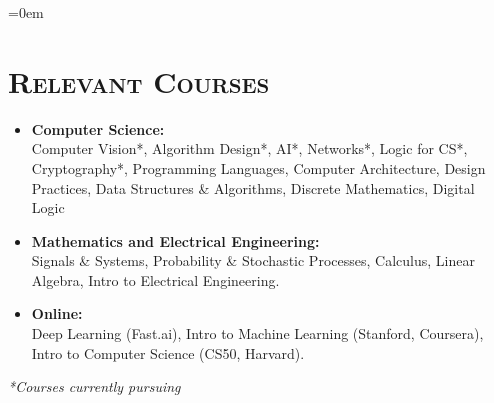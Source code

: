 \documentclass{article}
\makeatletter
\newenvironment{longversion}{}{} %
\newcommand{\headerrow}[2]
{\begin{tabular*}{\linewidth}{l@{\extracolsep{\fill}}r}
	#1 &
	#2 \\
\end{tabular*}}
\newcommand{\tmpsection}[1]{}
\let\tmpsection=\section
\renewcommand{\section}[1]{\tmpsection*{\textsc{#1}}}
\makeatother
\begin{document}
\begin{longversion}
\begin{list} {}{\leftmargin=0em}

\end{list}


\end{longversion}

\begin{longversion}
\section{Relevant Courses}
\begin{itemize}
\setlength\itemsep{-1em}
\item \textbf{Computer Science:} \\ 
Computer Vision*, Algorithm Design*, AI*, Networks*, Logic for CS*, Cryptography*, Programming Languages, Computer Architecture, Design Practices, Data Structures \& Algorithms, Discrete Mathematics, Digital Logic\\

\item \textbf{Mathematics and Electrical Engineering:} \\
Signals \& Systems, Probability \& Stochastic Processes, Calculus, Linear Algebra, Intro to Electrical Engineering.\\

\item \textbf{Online:} \\
Deep Learning (Fast.ai), Intro to Machine Learning (Stanford, Coursera), Intro to Computer Science (CS50, Harvard).


\end{itemize}



\textit{*Courses currently pursuing}
\end{longversion}
\end{document}
